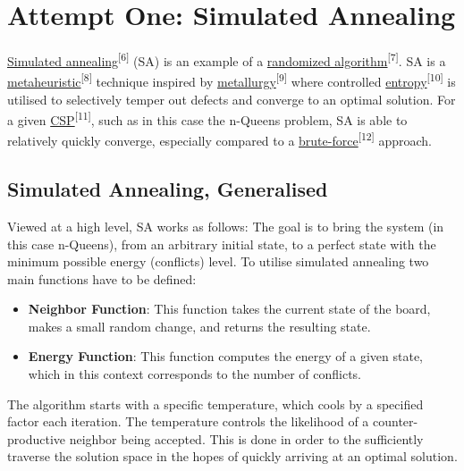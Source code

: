 \documentclass{article}
\begin{document}
\section{Attempt One: Simulated Annealing}
\href{https://en.wikipedia.org/wiki/Simulated_annealing}{Simulated annealing}\textsuperscript{[6]} (SA) is an example of a
\href{https://en.wikipedia.org/wiki/Randomized_algorithm}{randomized algorithm}\textsuperscript{[7]}.
SA is a \href{https://en.wikipedia.org/wiki/Metaheuristic}{metaheuristic}\textsuperscript{[8]} technique inspired by
\href{https://en.wikipedia.org/wiki/Metallurgy#:~:text=Metallurgy%20is%20a%20domain%20of,which%20are%20known%20as%20alloys.}{metallurgy}\textsuperscript{[9]} where controlled 
\href{https://en.wikipedia.org/wiki/Entropy}{entropy}\textsuperscript{[10]} is utilised to selectively temper out defects and converge to an optimal solution. For a given
\href{https://en.wikipedia.org/wiki/Constraint_satisfaction_problem}{CSP}\textsuperscript{[11]}, such as in this case the n-Queens problem, SA is able to relatively quickly converge,
especially compared to a \href{https://en.wikipedia.org/wiki/Brute-force_attack}{brute-force}\textsuperscript{[12]} approach.

\subsection{Simulated Annealing, Generalised}
Viewed at a high level, SA works as follows: The goal is to bring the system (in this case n-Queens), from an arbitrary initial state,
to a perfect state with the minimum possible energy (conflicts) level.
To utilise simulated annealing two main functions have to be defined:

\begin{itemize}
    \item \textbf{Neighbor Function}: This function takes the current state of the board, makes a small random change, and returns the resulting state.
    \item \textbf{Energy Function}: This function computes the energy of a given state, which in this context corresponds to the number of conflicts.
\end{itemize}

The algorithm starts with a specific temperature, which cools by a specified factor each iteration.
The temperature controls the likelihood of a counter-productive neighbor being accepted.
This is done in order to the sufficiently traverse the solution space in the hopes of quickly arriving at an optimal solution.
\end{document}
